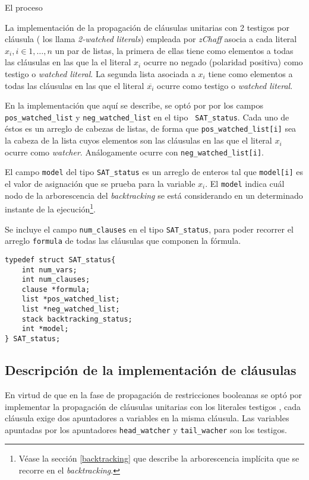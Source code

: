 \documentclass[12pt,lettersize]{article}
\begin{document}
El proceso

La implementación de la propagación de cláusulas unitarias con 2 testigos por
cláusula (\cite{} los llama \emph{2-watched literals}) empleada por
\emph{zChaff} asocia a cada literal $x_i, i\in{1,\ldots,n}$ un par de listas, la
primera de ellas tiene como elementos a todas las cláusulas en las que la el
literal $x_i$ ocurre no negado (polaridad positiva) como testigo o \emph{watched
  literal}. La segunda lista asociada a $x_i$ tiene como elementos a todas las
cláusulas en las que el literal $\overline{x_i}$ ocurre como testigo o
\emph{watched literal}. 

En la implementación que aquí se describe, se optó por por los campos {\tt
  pos\_watched\_list} y {\tt neg\_watched\_list} en el tipo {\tt
  SAT\_status}. Cada uno de éstos es un arreglo de cabezas de listas, de forma
que {\tt pos\_watched\_list[i]} sea la cabeza de la lista cuyos elementos son
las cláusulas en las que el literal $x_i$ ocurre como
\emph{watcher}. Análogamente ocurre con {\tt neg\_watched\_list[i]}.

El campo {\tt model} del tipo {\tt SAT\_status} es un arreglo de enteros tal que
{\tt model[i]} es el valor de asignación que se prueba para la variable
$x_i$. El {\tt model} indica cuál nodo de la arborescencia del
\emph{backtracking} se está considerando en un determinado instante de la
ejecución\footnote{Véase la sección \ref{backtracking} que describe la
  arborescencia implícita que se recorre en el \emph{backtracking}.}.

Se incluye el campo {\tt num\_clauses} en el tipo {\tt SAT\_status}, para poder
recorrer el arreglo {\tt formula} de todas las cláusulas que componen la fórmula.
\begin{lstlisting}
typedef struct SAT_status{    
    int num_vars;
    int num_clauses;
    clause *formula;
    list *pos_watched_list;
    list *neg_watched_list;
    stack backtracking_status;
    int *model;                     
} SAT_status;
\end{lstlisting}

\subsection{Descripción de la implementación de cláusulas}
En virtud de que en la fase de propagación de restricciones booleanas se optó
por implementar la propagación de cláusulas unitarias con los literales testigos
, cada cláusula exige
dos apuntadores a variables en la misma cláusula. Las variables apuntadas por
los apuntadores {\tt head\_watcher} y {\tt tail\_wacher} son los testigos.
\end{document}
